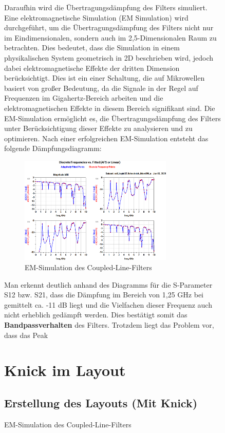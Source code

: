 \begin{figure}[H]
Daraufhin wird die Übertragungsdämpfung des Filters simuliert. Eine elektromagnetische Simulation (EM Simulation) wird durchgeführt, um die Übertragungsdämpfung des Filters nicht nur im Eindimensionalen, sondern auch im 2,5-Dimensionalen Raum zu betrachten. 
Dies bedeutet, dass die Simulation in einem physikalischen System geometrisch in 2D beschrieben wird, jedoch dabei elektromagnetische Effekte der dritten Dimension berücksichtigt. 
Dies ist ein einer Schaltung, die auf Mikrowellen basiert von großer Bedeutung, da die Signale in der Regel auf Frequenzen im Gigahertz-Bereich arbeiten und die elektromagnetischen Effekte in diesem Bereich signifikant sind. 
Die EM-Simulation ermöglicht es, die Übertragungsdämpfung des Filters unter Berücksichtigung dieser Effekte zu analysieren und zu optimieren.
Nach einer erfolgreichen EM-Simulation entsteht das folgende Dämpfungsdiagramm:
\begin{figure}[H]
    \centering
    \includegraphics[width=0.8\textwidth]{Pictures/EMSimulationohneKnick.png}
    \caption{EM-Simulation des Coupled-Line-Filters}
\end{figure}

Man erkennt deutlich anhand des Diagramms für die S-Parameter S12 bzw. S21, dass die Dämpfung im Bereich von 1,25 GHz bei gemittelt ca. -11 dB liegt und die Vielfachen dieser Frequenz auch nicht erheblich gedämpft werden. Dies bestätigt somit das \textbf{Bandpassverhalten} des Filters.
Trotzdem liegt das Problem vor, dass das Peak 
\section{Knick im Layout}
    \subsection{Erstellung des Layouts (Mit Knick)}


\end{figure}
